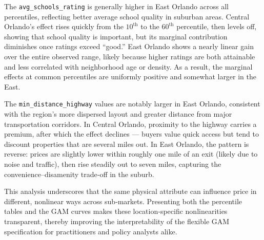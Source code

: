 The \texttt{avg\_schools\_rating} is generally higher in East Orlando across all percentiles, reflecting better average school quality in suburban areas. Central Orlando’s effect rises quickly from the $10^{\text{th}}$ to the $60^{\text{th}}$ percentile, then levels off, showing that school quality is important, but its marginal contribution diminishes once ratings exceed “good.” East Orlando shows a nearly linear gain over the entire observed range, likely because higher ratings are both attainable and less correlated with neighborhood age or density. As a result, the marginal effects at common percentiles are uniformly positive and somewhat larger in the East.

The \texttt{min\_distance\_highway} values are notably larger in East Orlando, consistent with the region’s more dispersed layout and greater distance from major transportation corridors. In Central Orlando, proximity to the highway carries a premium, after which the effect declines --- buyers value quick access but tend to discount properties that are several miles out. In East Orlando, the pattern is reverse: prices are slightly lower within roughly one mile of an exit (likely due to noise and traffic), then rise steadily out to seven miles, capturing the convenience–disamenity trade‑off in the suburb.

This analysis underscores that the same physical attribute can influence price in different, nonlinear ways across sub‑markets. Presenting both the percentile tables and the GAM curves makes these location‑specific nonlinearities transparent, thereby improving the interpretability of the flexible GAM specification for practitioners and policy analysts alike.



